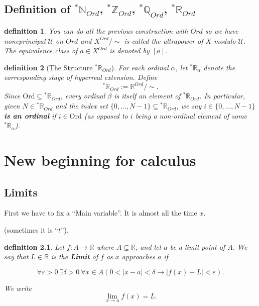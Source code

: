 \documentclass[10pt,a4paper]{book}
\newtheorem{definition}{definition}[section]
\begin{document}
\section{Definition of ${}^\ast\mathbb{N}_{Ord}$, ${}^\ast\mathbb{Z}_{Ord}$, ${}^\ast\mathbb{Q}_{Ord}$,  ${}^\ast\mathbb{R}_{Ord}$ }



\begin{definition}
    You can do all the previous construction with $Ord$ so we have
    noneprincipal $\mathcal{U}$ on $Ord$ and
    $
        X^ {Ord} /\sim
    $
    is called the \emph{ultrapower} of $X$ modulo $\mathcal{U}$. The equivalence
    class of $a\in X^ {Ord} $ is denoted by $[a]$.
\end{definition}

\begin{definition}[The Structure ${}^*\mathbb{R}_{Ord}$]
    For each ordinal $\alpha$, let ${}^*\mathbb{R}_\alpha$ denote the corresponding stage of hyperreal extension. Define
    $$
        {}^*\mathbb{R}_{Ord}:= \mathbb{R}^ {Ord} /\sim.
    $$
    Since $\mathrm{Ord}\subseteq{}^*\mathbb{R}_{Ord}$, every ordinal $\beta$ is itself an element of ${}^*\mathbb{R}_{Ord}$. In particular, given $N\in{}^*\mathbb{R}_{Ord}$ and the index set $\{0,\ldots,N-1\}\subseteq{}^*\mathbb{R}_{Ord}$, we say $i\in\{0,\ldots,N-1\}$ \textbf{is an ordinal} if $i\in\mathrm{Ord}$ (as opposed to $i$ being a non-ordinal element of some ${}^*\mathbb{R}_\alpha$).
\end{definition}

\chapter{New beginning for calculus }
\section{Limits}

First we have to fix a ``Main variable''. It is almost all the time $x$.

(sometimes it is ``$t$'').

\begin{definition}
    Let $ f:A\to\mathbb{R} $
    where $A\subseteq\mathbb{R}$, and let $a$ be a limit point of $A$.
    We say that $L\in\mathbb{R}$ is the \textbf{Limit} of $f$ as $x$
    approaches $a$ if

    \[
        \forall\varepsilon>0\ \exists\delta>0\
        \forall x\in A
        \left(
        0<|x-a|<\delta
        \to
        |f(x)-L|<\varepsilon
        \right).
    \]

    We write
    \[
        \lim_{x\to a}f(x)=L.
    \]

\end{definition}
\end{document}
